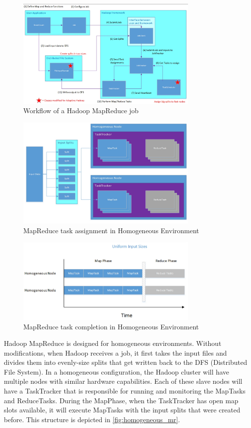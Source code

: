 \begin{figure}[ht!]
\centering
\includegraphics[width=90mm]{flow.jpg}
\caption{Workflow of a Hadoop MapReduce job}
\label{fig:flow}
\end{figure}

\begin{figure}[ht!]
\centering
\includegraphics[width=90mm]{homogeneous_mr.jpg}
\caption{MapReduce task assignment in Homogeneous Environment}
\label{fig:homogeneoues_mr}
\end{figure}

\begin{figure}[ht!]
\centering
\includegraphics[width=90mm]{homogeneous_time.jpg}
\caption{MapReduce task completion in Homogeneous Environment}
\label{fig:homogeneoues_time}
\end{figure}

Hadoop MapReduce is designed for homogeneous environments. Without modifications, when Hadoop receives a job,
it first takes the input files and divides them into evenly-size splits that
get written back to the DFS (Distributed File System). In a homogeneous configuration, the Hadoop cluster
will have multiple nodes with similar hardware capabilities. Each of these slave nodes will have a
TaskTracker that is responsible for running and monitoring the MapTasks and ReduceTasks. During the MapPhase,
when the TaskTracker has open map slots available, it will execute MapTasks with the input splits that were
created before. This structure is depicted in \ref{fig:homogeneous_mr}.



